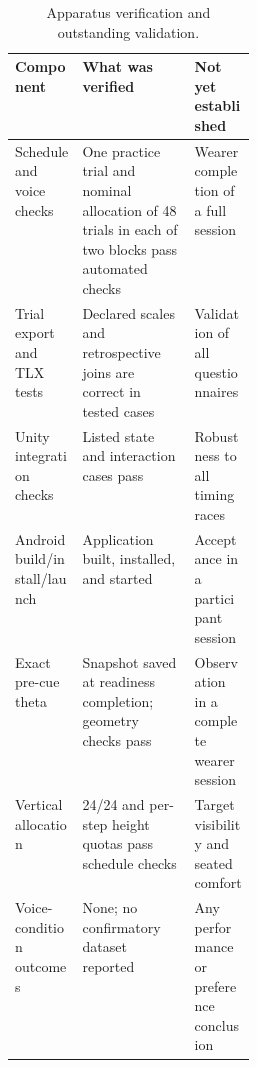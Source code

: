 \begin{table}[htbp]
\centering\caption{Apparatus verification and outstanding validation.}
\small{}
\begin{tabularx}{\linewidth}{@{}p{0.28\linewidth}XX@{}}\toprule
Component & What was verified & Not yet established \\\midrule
Schedule and voice checks & One practice trial and nominal allocation of 48 trials in each of two blocks pass automated checks & Wearer completion of a full session \\
Trial export and TLX tests & Declared scales and retrospective joins are correct in tested cases & Validation of all questionnaires \\
Unity integration checks & Listed state and interaction cases pass & Robustness to all timing races \\
Android build/install/launch & Application built, installed, and started & Acceptance in a participant session \\
Exact pre-cue theta & Snapshot saved at readiness completion; geometry checks pass & Observation in a complete wearer session \\
Vertical allocation & 24/24 and per-step height quotas pass schedule checks & Target visibility and seated comfort \\
Voice-condition outcomes & None; no confirmatory dataset reported & Any performance or preference conclusion \\\bottomrule
\end{tabularx}
\end{table}


